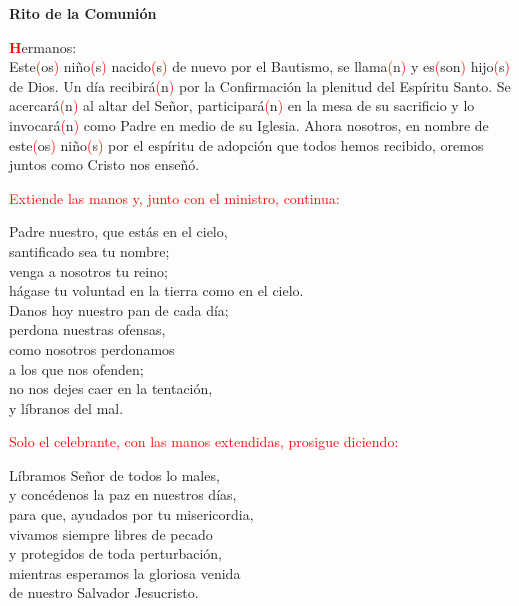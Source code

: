 \documentclass[12pt, letterpaper]{report}
\begin{document}
\newpage

\begin{center}
\Huge {\bfseries Rito de la Comuni\'on}
\end{center}

\lettrine[lines=1]{\bfseries \textcolor{red}{H}}{}\Large ermanos: \\
Este\textcolor{red}{(}os\textcolor{red}{)} ni\~no\textcolor{red}{(}s\textcolor{red}{)} nacido\textcolor{red}{(}s\textcolor{red}{)} de nuevo por el Bautismo, se llama\textcolor{red}{(}n\textcolor{red}{)} y es\textcolor{red}{(}son\textcolor{red}{)} hijo\textcolor{red}{(}s\textcolor{red}{)} de Dios. Un d\'ia recibir\'a\textcolor{red}{(}n\textcolor{red}{)} por la Confirmaci\'on la plenitud del Esp\'iritu Santo. Se acercar\'a\textcolor{red}{(}n\textcolor{red}{)} al altar del Se\~nor, participar\'a\textcolor{red}{(}n\textcolor{red}{)} en la mesa de su sacrificio y lo invocar\'a\textcolor{red}{(}n\textcolor{red}{)} como Padre en medio de su Iglesia. Ahora nosotros, en nombre de este\textcolor{red}{(}os\textcolor{red}{)} ni\~no\textcolor{red}{(}s\textcolor{red}{)} por el esp\'iritu de adopci\'on que todos hemos recibido, oremos juntos como Cristo nos ense\~n\'o.

\large{\textcolor{red}{Extiende las manos y, junto con el ministro, continua:}}

\noindent
\Large Padre nuestro, que est\'as en el cielo,\\
santificado sea tu nombre;\\
venga a nosotros tu reino;\\
h\'agase tu voluntad en la tierra como en el cielo.\\
Danos hoy nuestro pan de cada d\'ia;\\
perdona nuestras ofensas,\\
como nosotros perdonamos\\
a los que nos ofenden;\\
no nos dejes caer en la tentaci\'on,\\
y l\'ibranos del mal.

\large{\textcolor{red}{Solo el celebrante, con las manos extendidas, prosigue diciendo:}}

\noindent
\Large L\'ibramos Se\~nor de todos lo males,\\ 
y conc\'edenos la paz en nuestros d\'ias,\\ 
para que, ayudados por tu misericordia,\\ 
vivamos siempre libres de pecado\\ 
y protegidos de toda perturbaci\'on,\\ 
mientras esperamos la gloriosa venida\\ 
de nuestro Salvador Jesucristo.
\end{document}
